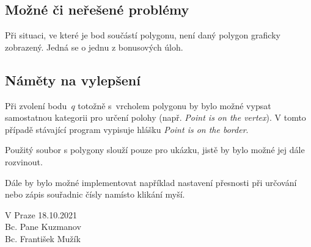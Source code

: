 \documentclass[a4paper, 12pt, oneside, titlepage]{article} %
\begin{document}
\subsection*{Možné či neřešené problémy}
Při situaci, ve které je bod součástí polygonu, není daný polygon graficky zobrazený. Jedná se o jednu z bonusových úloh.


\subsection*{Náměty na vylepšení}
Při zvolení bodu~$q$ totožně s~vrcholem polygonu by bylo možné vypsat samostatnou kategorii pro určení polohy (např. \emph{Point is on the vertex}). V tomto případě stávající program vypisuje hlášku \emph{Point is on the border}.

Použitý soubor s polygony slouží pouze pro ukázku, jistě by bylo možné jej dále rozvinout. 

Dále by bylo možné implementovat například nastavení přesnosti při určování nebo zápis souřadnic čísly namísto klikání myší.


\begin{flushright}
V Praze 18.10.2021\\
\vspace{2mm}
Bc. Pane Kuzmanov\\
Bc. František Mužík\\
\end{flushright}
\end{document}
